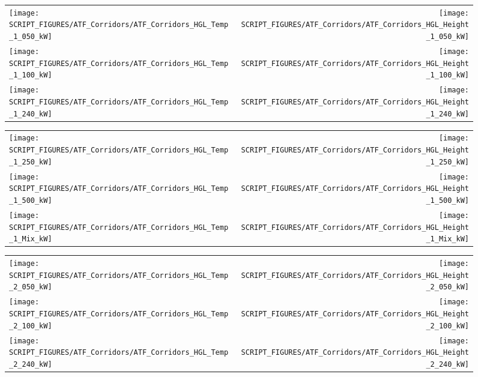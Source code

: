 \begin{figure}
\begin{tabular*}{\textwidth}{l@{\extracolsep{\fill}}r}
\texttt{[image: SCRIPT\_FIGURES/ATF\_Corridors/ATF\_Corridors\_HGL\_Temp\_1\_050\_kW]} &
\texttt{[image: SCRIPT\_FIGURES/ATF\_Corridors/ATF\_Corridors\_HGL\_Height\_1\_050\_kW]} \\
\texttt{[image: SCRIPT\_FIGURES/ATF\_Corridors/ATF\_Corridors\_HGL\_Temp\_1\_100\_kW]} &
\texttt{[image: SCRIPT\_FIGURES/ATF\_Corridors/ATF\_Corridors\_HGL\_Height\_1\_100\_kW]} \\
\texttt{[image: SCRIPT\_FIGURES/ATF\_Corridors/ATF\_Corridors\_HGL\_Temp\_1\_240\_kW]} &
\texttt{[image: SCRIPT\_FIGURES/ATF\_Corridors/ATF\_Corridors\_HGL\_Height\_1\_240\_kW]}
\end{tabular*}
\end{figure}

\begin{figure}
\begin{tabular*}{\textwidth}{l@{\extracolsep{\fill}}r}
\texttt{[image: SCRIPT\_FIGURES/ATF\_Corridors/ATF\_Corridors\_HGL\_Temp\_1\_250\_kW]} &
\texttt{[image: SCRIPT\_FIGURES/ATF\_Corridors/ATF\_Corridors\_HGL\_Height\_1\_250\_kW]} \\
\texttt{[image: SCRIPT\_FIGURES/ATF\_Corridors/ATF\_Corridors\_HGL\_Temp\_1\_500\_kW]} &
\texttt{[image: SCRIPT\_FIGURES/ATF\_Corridors/ATF\_Corridors\_HGL\_Height\_1\_500\_kW]} \\
\texttt{[image: SCRIPT\_FIGURES/ATF\_Corridors/ATF\_Corridors\_HGL\_Temp\_1\_Mix\_kW]} &
\texttt{[image: SCRIPT\_FIGURES/ATF\_Corridors/ATF\_Corridors\_HGL\_Height\_1\_Mix\_kW]}
\end{tabular*}
\end{figure}

\begin{figure}
\begin{tabular*}{\textwidth}{l@{\extracolsep{\fill}}r}
\texttt{[image: SCRIPT\_FIGURES/ATF\_Corridors/ATF\_Corridors\_HGL\_Temp\_2\_050\_kW]} &
\texttt{[image: SCRIPT\_FIGURES/ATF\_Corridors/ATF\_Corridors\_HGL\_Height\_2\_050\_kW]} \\
\texttt{[image: SCRIPT\_FIGURES/ATF\_Corridors/ATF\_Corridors\_HGL\_Temp\_2\_100\_kW]} &
\texttt{[image: SCRIPT\_FIGURES/ATF\_Corridors/ATF\_Corridors\_HGL\_Height\_2\_100\_kW]} \\
\texttt{[image: SCRIPT\_FIGURES/ATF\_Corridors/ATF\_Corridors\_HGL\_Temp\_2\_240\_kW]} &
\texttt{[image: SCRIPT\_FIGURES/ATF\_Corridors/ATF\_Corridors\_HGL\_Height\_2\_240\_kW]}
\end{tabular*}
\end{figure}

